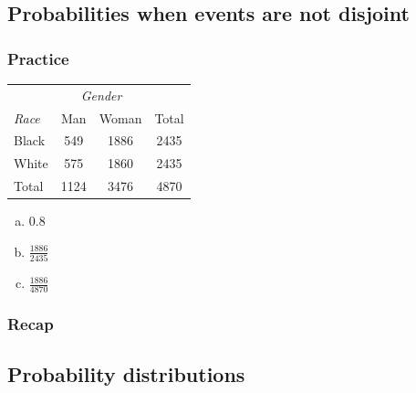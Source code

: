 \documentclass[notes,11pt, aspectratio=169]{beamer}
\begin{document}
\subsection{Probabilities when events are not disjoint}


\begin{frame}
\frametitle{Practice}


{\small
\begin{center}
\begin{tabular}{l  cc c}
            & \multicolumn{2}{c}{\textit{Gender}} & \\
\cline{2-3}
\textit{Race} &Man & Woman & Total \\
\hline
Black         & 549 & 1886 & 2435 \\
White         & 575 & 1860 & 2435 \\
\hline
Total       & 1124 & 3476 & 4870
\end{tabular}
\end{center}
}


\begin{enumerate}[(a)]
\item $ 0.8 $
\item $\frac{1886}{2435}$
\item $\frac{1886}{4870}$
\end{enumerate}

\end{frame}


\begin{frame}
\frametitle{Recap}



\end{frame}


\subsection{Probability distributions}
\end{document}
